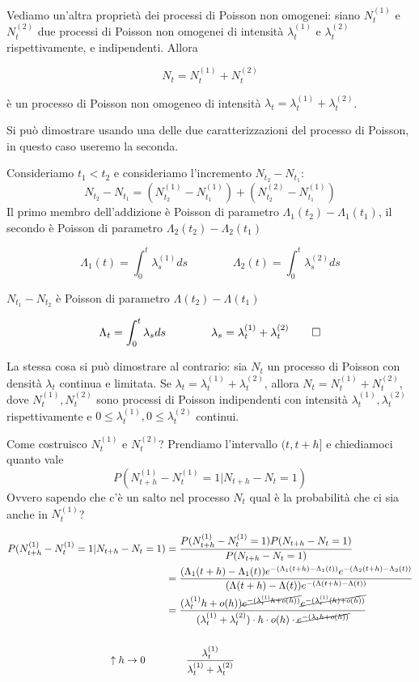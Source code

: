 \documentclass[a4paper,12pt]{book}
\begin{document}
Vediamo un'altra proprietà dei processi di Poisson non omogenei: siano $ N_t^{(1)} $ e $ N_t^{(2)} $ due processi di Poisson non omogenei di intensità $\lambda_t^{(1)}$ e $ \lambda_t^{(2)} $ rispettivamente, e indipendenti. Allora

$$ N_t = N_t^{(1)} + N_t^{(2)} $$

è un processo di Poisson non omogeneo di intensità $ \lambda_t = \lambda_t^{(1)} + \lambda_t^{(2)} $.

Si può dimostrare usando una delle due caratterizzazioni del processo di Poisson, in questo caso useremo la seconda. 

Consideriamo $ t_1 < t_2 $ e consideriamo l'incremento $ N_{t_2} - N_{t_1} $:
$$ N_{t_2} - N_{t_1} = (N_{t_2}^{(1)} - N_{t_1}^{(1)}) + (N_{t_2}^{(2)} - N_{t_1}^{(1)}) $$
Il primo membro dell'addizione è Poisson di parametro $\Lambda_1(t_2) - \Lambda_1(t_1)$, il secondo è Poisson di parametro $ \Lambda_2(t_2) - \Lambda_2(t_1) $

$$ \Lambda_1(t) = \int_{0}^{t} \lambda_s^{(1)} ds \qquad \qquad \Lambda_2(t) = \int_{0}^{t} \lambda_s^{(2)} ds $$


$ N_{t_1} - N_{t_2} $ è Poisson di parametro $\Lambda(t_2) - \Lambda(t_1)$

$$ \Lambda_t = \int_{0}^{t} \lambda_s ds \qquad \qquad \lambda_s = \lambda_t^{(1)} + \lambda_t^{(2)} \qed$$

La stessa cosa si può dimostrare al contrario: sia $ N_t $ un processo di Poisson con densità $\lambda_{t}$ continua e limitata. Se $\lambda_{t} = \lambda_t^{(1)} + \lambda_t^{(2)}$, allora $ N_t = N_t^{(1)} + N_t^{(2)} $, dove $ N_t^{(1)}, N_t^{(2)} $ sono processi di Poisson indipendenti con intensità $\lambda_t^{(1)}, \lambda_t^{(2)}$ rispettivamente e $ 0 \le \lambda_t^{(1)}, 0 \le \lambda_t^{(2)} $ continui. 

Come costruisco $ N_t^{(1)} $ e $ N_t^{(2)} $? Prendiamo l'intervallo $ (t, t+h] $ e chiediamoci quanto vale 
$$ P(N_{t+h}^{(1)} - N_t^{(1)} = 1 | N_{t+h} - N_t = 1)  $$
Ovvero sapendo che c'è un salto nel processo $ N_t $ qual è la probabilità che ci sia anche in $ N_t^{(1)} $?

\begin{align*}
	P(N_{t+h}^{(1)} - N_t^{(1)} = 1| N_{t+h} - N_t = 1) & = \frac{P(N_{t+h}^{(1)} - N_t^{(1)}= 1) P(N_{t+h} - N_t = 1)}{P(N_{t+h} - N_t = 1)} \\
	& = \frac{(\Lambda_1(t+h) - \Lambda_1(t))e^{-(\Lambda_{1}(t+h) - \Lambda_1(t))}e^{-(\Lambda_2(t+h) - \Lambda_2(t))} }{(\Lambda(t+h) - \Lambda(t)) e^{-(\Lambda(t+h) - \Lambda(t))}} \\
	& = \frac{(\lambda_t^{(1)} h + o(h)) \cancel{e^{-(\lambda_t^{(1)}h + o(h))}} \cancel{e^{-(\lambda_t^{(1)}(h) +o(h))}} }{ (\lambda_t^{(1)} + \lambda_t^{(2)} ) \cdot h \cdot o(h) \cdot \cancel{ e^{-(\lambda_t h + o(h))} } }
	\\
	\\
	\uparrow h \to 0 \qquad  & \qquad \frac{\lambda_t^{(1)}}{\lambda_t^{(1)} + \lambda_t^{(2)}}
\end{align*}
\end{document}
